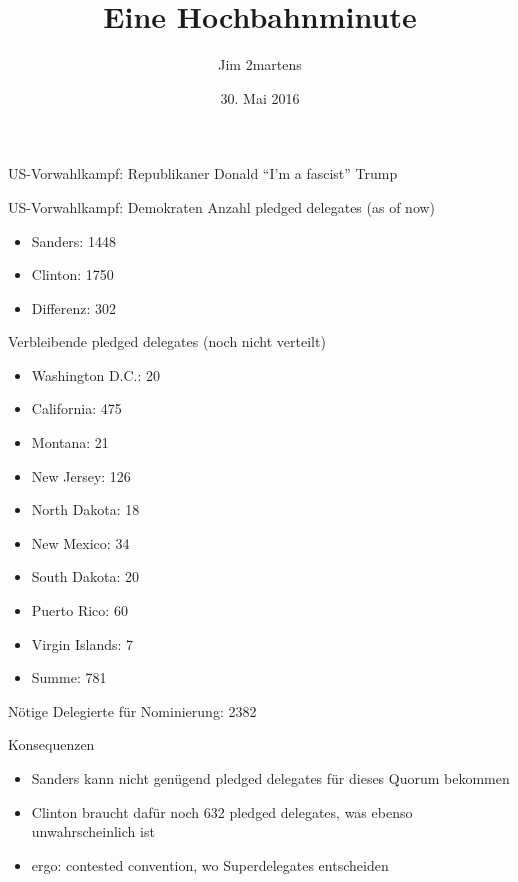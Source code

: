 \documentclass{beamer}
\begin{document}
\author{Jim 2martens}
\title{Eine Hochbahnminute}
\date{30. Mai 2016}

\begin{frame}
  \titlepage
\end{frame}

\begin{frame}{US-Vorwahlkampf: Republikaner}
  \centering
  Donald "`I'm a fascist"' Trump
\end{frame}

\begin{frame}{US-Vorwahlkampf: Demokraten}
  Anzahl pledged delegates (as of now)
  \begin{itemize}
    \item Sanders: 1448
    \item Clinton: 1750
    \item Differenz: 302
  \end{itemize}

  Verbleibende pledged delegates (noch nicht verteilt)
  \begin{itemize}
    \item Washington D.C.: 20
    \item California: 475
    \item Montana: 21
    \item New Jersey: 126
    \item North Dakota: 18
    \item New Mexico: 34
    \item South Dakota: 20
    \item Puerto Rico: 60
    \item Virgin Islands: 7
    \item Summe: 781
  \end{itemize}

  Nötige Delegierte für Nominierung: 2382
\end{frame}

\begin{frame}{Konsequenzen}
  \begin{itemize}
    \item Sanders kann nicht genügend pledged delegates für dieses Quorum bekommen
    \item Clinton braucht dafür noch 632 pledged delegates, was ebenso unwahrscheinlich ist
    \item ergo: contested convention, wo Superdelegates entscheiden
  \end{itemize}
\end{frame}
\end{document}
